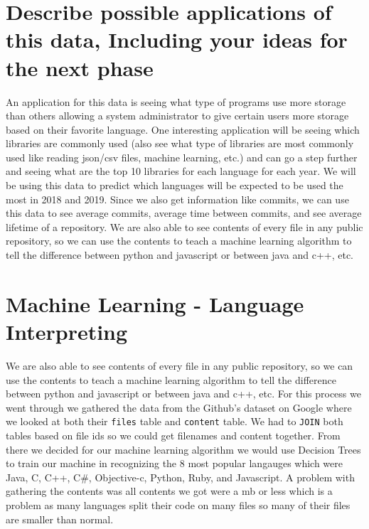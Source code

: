 \documentclass[11pt]{article}
\begin{document}
    \hypertarget{describe-possible-applications-of-this-data-including-your-ideas-for-the-next-phase}{%
\section{Describe possible applications of this data, Including your
ideas for the next
phase}\label{describe-possible-applications-of-this-data-including-your-ideas-for-the-next-phase}}

An application for this data is seeing what type of programs use more
storage than others allowing a system administrator to give certain
users more storage based on their favorite language. One interesting
application will be seeing which libraries are commonly used (also see
what type of libraries are most commonly used like reading json/csv
files, machine learning, etc.) and can go a step further and seeing what
are the top 10 libraries for each language for each year. We will be
using this data to predict which languages will be expected to be used
the most in 2018 and 2019. Since we also get information like commits,
we can use this data to see average commits, average time between
commits, and see average lifetime of a repository. We are also able to
see contents of every file in any public repository, so we can use the
contents to teach a machine learning algorithm to tell the difference
between python and javascript or between java and c++, etc.

    \hypertarget{machine-learning---language-interpreting}{%
\section{Machine Learning - Language
Interpreting}\label{machine-learning---language-interpreting}}

    We are also able to see contents of every file in any public repository,
so we can use the contents to teach a machine learning algorithm to tell
the difference between python and javascript or between java and c++,
etc. For this process we went through we gathered the data from the
Github's dataset on Google where we looked at both their \texttt{files}
table and \texttt{content} table. We had to \texttt{JOIN} both tables
based on file ids so we could get filenames and content together. From
there we decided for our machine learning algorithm we would use
Decision Trees to train our machine in recognizing the 8 most popular
langauges which were Java, C, C++, C\#, Objective-c, Python, Ruby, and
Javascript. A problem with gathering the contents was all contents we
got were a mb or less which is a problem as many languages split their
code on many files so many of their files are smaller than normal.
\end{document}

